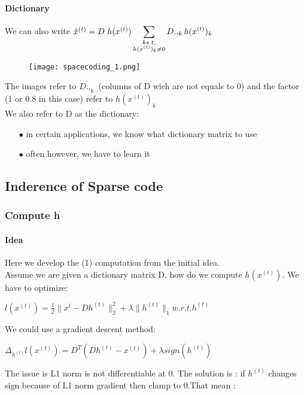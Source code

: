 \documentclass[a4paper,10pt]{article}
\begin{document}
\paragraph{Dictionary}
We can also write $\hat{x}^{(t)} = D\hspace{3px} h(x^{(t)}) \displaystyle\sum_{\substack{k s.t.\\ h(x^{(t)})_k\neq 0}}  D.,_k h(x^{(t)} )_k$
\begin{figure}[h]
 \centering
 \texttt{[image: spacecoding\_1.png]}
\end{figure}

The images refer to $D.,_k$ (columns of D wich are not equals to 0) and the factor (1 or 0.8 in this case) refer to $h(x^{(t)} )_k$
\\We also refer to D as the dictionary:
\begin{itemize}
 \item[$\bullet$]in certain applications, we know what dictionary matrix to use
 \item[$\bullet$]often however, we have to learn it
\end{itemize}

\subsection{Inderence of Sparse code}
\subsubsection{Compute h}
\paragraph{Idea}
Here we develop the (1) computation  from the initial idea.\\
Assume we are given a dictionary matrix D, how do we compute $h(x^{(t)})$. We have to optimize:
\begin{center}
$l(x^{(t)}) = \frac{1}{2} \| x^{t}- D h^{(t)} \|^{2}_{2} + \lambda \|h^{(t)}\|_1 w.r.t. h^{(t)}$\\ 
\end{center}
We could use a gradient descent method:\\
\begin{center}
$\Delta_{h^{(t)}} l(x^{(t)}) = D^T (D h^{(t)} - x^{(t)}) + \lambda sign(h^{(t)})$
\end{center}
The issue is L1 norm is not differentiable at 0. The solution is : if $h^(t)$ changes sign because of L1 norm gradient then clamp to 0.That mean :
\end{document}
